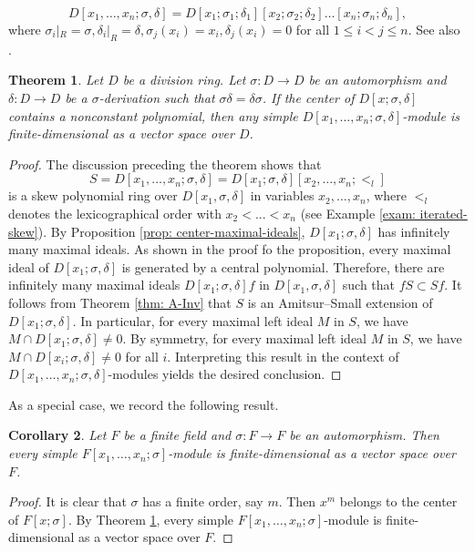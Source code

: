 \documentclass[11pt,a4paper]{article}
\theoremstyle{theorem}
\newtheorem{theorem}{Theorem}[section]
\newtheorem{corollary}[theorem]{Corollary}
\numberwithin{equation}{section}
\newcommand{\s}{\sigma}
\begin{document}
	\[
		D[x_1,\dots,x_n;\sigma,\delta] = D[x_1;\s_1;\delta_1][x_2;\s_2;\delta_2]\dots [x_n;\s_n;\delta_n],
	\] 
	where \(\s_i|_R =\s, \delta_i|_R = \delta,  \s_j(x_i) = x_i,  \delta_j(x_i) = 0\) for all \(1\leq i < j \leq n\). See also \cite[Theorem 4.2]{voskoglou1986extending}. 
	\begin{theorem}\label{thm: skew-AS}
		Let $D$ be a division ring. Let $\s:D\to D$ be an automorphism  and $\delta:D\to D$ be   a $\s$-derivation such that \(\sigma\delta = \delta\sigma\).   If the center of $D[x;\s,\delta]$ contains a nonconstant polynomial, then any simple  \(D[x_1,\dots,x_n;\sigma,\delta]\)-module is finite-dimensional as a vector space over $D$.  
	\end{theorem}

	\begin{proof}
		The discussion preceding the theorem shows that  \[S = D[x_1,\dots,x_n;\sigma,\delta] = D[x_1;\sigma,\delta][x_2,\dots,x_n; <_l] \]	
		is a skew polynomial ring over \(D[x_1,\sigma, \delta]\) in variables \(x_2,\dots,x_n\), where \(<_l\) denotes  the lexicographical order  with $x_2<...<x_n$ (see Example \ref{exam: iterated-skew}). By Proposition \ref{prop: center-maximal-ideals}, \(D[x_1;\sigma,\delta]\) has infinitely many maximal ideals. As shown in the proof fo the proposition, every maximal ideal of \(D[x_1;\sigma,\delta]\) is generated by a central polynomial. Therefore, there are infinitely many maximal ideals \(D[x_1;\sigma,\delta]f\) in \(D[x_1,\sigma, \delta]\) such that \(fS\subset Sf\). It follows from Theorem \ref{thm: A-Inv} that \(S\) is an Amitsur--Small extension of \(D[x_1;\sigma,\delta]\). In particular, for every maximal left ideal \(M\) in \(S\), we have \(M\cap D[x_1;\sigma,\delta]\neq 0\). By symmetry, for every maximal left ideal \(M\) in \(S\), we have \(M\cap D[x_i;\sigma,\delta]\neq 0\) for all \(i\). Interpreting this result in the context of \(D[x_1,\dots,x_n;\sigma,\delta]\)-modules yields the desired conclusion. 
	\end{proof}

	As a special case, we record the following result.
	\begin{corollary}
		Let $F$ be a finite field and $\s:F\to F$ be an automorphism. Then  every simple \(F[x_1,\dots,x_n;\sigma]\)-module is finite-dimensional as a vector space over \(F\).  
	\end{corollary}
	\begin{proof}
		It is clear that \(\s\) has a finite order, say \(m\). Then \(x^m\) belongs to the center of \(F[x;\sigma]\). By Theorem \ref{thm: skew-AS}, every simple \(F[x_1,\dots,x_n;\sigma]\)-module is finite-dimensional as a vector space over \(F\).
	\end{proof}
\end{document}
